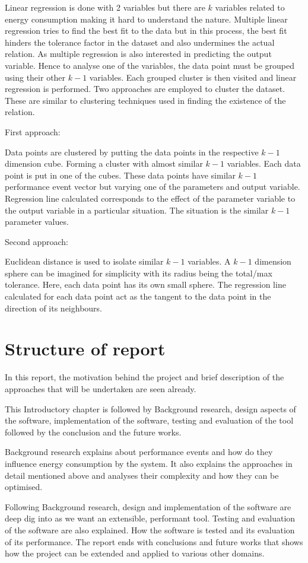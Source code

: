 Linear regression is done with 2 variables but there are \(k\) variables related to energy consumption making it hard to understand the nature. Multiple linear regression tries to find the best fit to the data but in this process, the best fit hinders the tolerance factor in the dataset and also undermines the actual relation. As multiple regression is also interested in predicting the output variable. Hence to analyse one of the variables, the data point must be grouped using their other \(k-1\) variables. Each grouped cluster is then visited and linear regression is performed. Two approaches are employed to cluster the dataset. These are similar to clustering techniques used in finding the existence of the relation.

First approach:

Data points are clustered by putting the data points in the respective \(k-1\) dimension cube. Forming a cluster with almost similar \(k-1\) variables. Each data point is put in one of the cubes. These data points have similar \(k-1\) performance event vector but varying one of the parameters and output variable. Regression line calculated corresponds to the effect of the parameter variable to the output variable in a particular situation. The situation is the similar \(k-1\) parameter values.

Second approach:

Euclidean distance is used to isolate similar \(k-1\) variables. A \(k-1\) dimension sphere can be imagined for simplicity with its radius being the total/max tolerance. Here, each data point has its own small sphere. The regression line calculated for each data point act as the tangent to the data point in the direction of its neighbours.

\section{Structure of report}

In this report, the motivation behind the project and brief description of the approaches that will be undertaken are seen already.

This Introductory chapter is followed by Background research, design aspects of the software, implementation of the software, testing and evaluation of the tool followed by the conclusion and the future works.

Background research explains about performance events and how do they influence energy consumption by the system. It also explains the approaches in detail mentioned above and analyses their complexity and how they can be optimised.

Following Background research, design and implementation of the software are deep dig into as we want an extensible, performant tool. Testing and evaluation of the software are also explained. How the software is tested and its evaluation of its performance. The report ends with conclusions and future works that shows how the project can be extended and applied to various other domains.